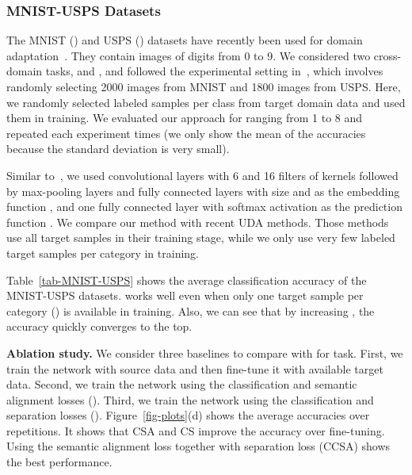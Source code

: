 \subsubsection{MNIST-USPS Datasets} \label{sec-MNIST-USPS}

The MNIST () and USPS () datasets have recently been used for domain adaptation~\cite{fernandoTT15prl,rozantsev2016beyond}. They contain images of digits from 0 to 9. We considered two cross-domain tasks,  and , and followed the experimental setting in~\cite{fernandoTT15prl,rozantsev2016beyond}, which involves randomly selecting 2000 images from MNIST and 1800 images from USPS. Here, we randomly selected  labeled samples per class from target domain data and used them in training. We evaluated our approach for  ranging from 1 to 8 and repeated each experiment  times (we only show the mean of the accuracies because the standard deviation is very small).

\begin{comment}
Since the images of the USPS dataset have  pixels, we resized the images of the MNIST dataset to  pixels. 

 where {\tt CCSA-} stands for our method when we use  labeled target samples per category in training.
\end{comment}

Similar to~\cite{lecun1998gradient}, we used  convolutional layers with 6 and 16 filters of  kernels followed by max-pooling layers and  fully connected layers with size  and  as the embedding function , and one fully connected layer with softmax activation as the prediction function . We compare our method with  recent UDA methods. Those methods use all target samples in their training stage, while we only use very few labeled target samples per category in training.

Table~\ref{tab-MNIST-USPS} shows the average classification accuracy of the MNIST-USPS datasets. \modelDA works well even when only one target sample per category () is available in training. Also, we can see that by increasing , the accuracy quickly converges to the top.

\noindent \textbf{Ablation study.} We consider three baselines to compare with \modelDA  for  task. First, we train the network with source data and then fine-tune it with available target data. Second, we train the network using the classification and semantic
alignment losses (). Third, we train the network using the classification and separation losses (). Figure~\ref{fig-plots}(d) shows the average accuracies over  repetitions. It shows that CSA and CS improve the accuracy over fine-tuning. Using the semantic alignment loss together with separation loss (CCSA) shows the best performance.


